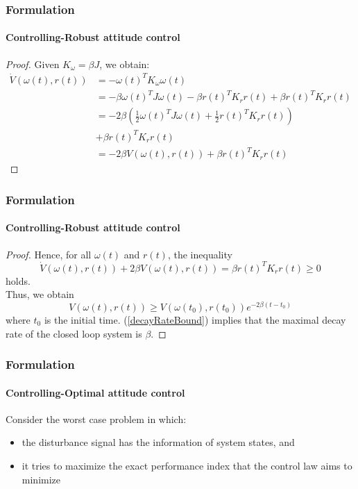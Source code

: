\documentclass{beamer}
\begin{document}
\begin{frame}
\frametitle{Formulation}
\framesubtitle{Controlling-Robust attitude control}
\begin{proof}
	Given $K_{\omega}=\beta J$, we obtain:
	\begin{equation}
	\begin{split}
	\dot{V}(\omega(t),r(t))&=-\omega(t)^{T}K_{\omega}\omega(t)\\
	&=-\beta\omega(t)^{T}J\omega(t)-\beta r(t)^{T}K_{r}r(t)+\beta r(t)^{T}K_{r}r(t)\\
	&=-2\beta\left(\frac{1}{2}\omega(t)^{T}J\omega(t)+\frac{1}{2}r(t)^{T}K_{r}r(t)\right)\\
	&+\beta r(t)^{T}K_{r}r(t)\\
	&=-2\beta V(\omega(t),r(t))+\beta r(t)^{T}K_{r}r(t)
	\end{split}
	\end{equation}
\end{proof}
\end{frame}

\begin{frame}
\frametitle{Formulation}
\framesubtitle{Controlling-Robust attitude control}
\begin{proof}
	Hence, for all $\omega(t)$ and $r(t)$, the inequality
	\begin{equation}
		\dot{V}(\omega(t),r(t))+2\beta V(\omega(t),r(t))=\beta r(t)^{T}K_{r}r(t)\geq 0
	\end{equation}
	holds.\\
	Thus, we obtain
	\begin{equation}\label{decayRateBound}
		V(\omega(t),r(t))\geq V(\omega(t_{0}),r(t_{0}))e^{-2\beta(t-t_{0})}
	\end{equation}
	where $t_{0}$ is the initial time. (\ref{decayRateBound}) implies that the maximal decay rate of the closed loop system is $\beta$. 
\end{proof}
\end{frame}

\begin{frame}
\frametitle{Formulation}
\framesubtitle{Controlling-Optimal attitude control}
Consider the worst case problem in which:
\begin{itemize}
	\item the disturbance signal has the information of system states, and
	\item it tries to maximize the exact performance index that the control law aims to minimize
\end{itemize}
\end{frame}
\end{document}
